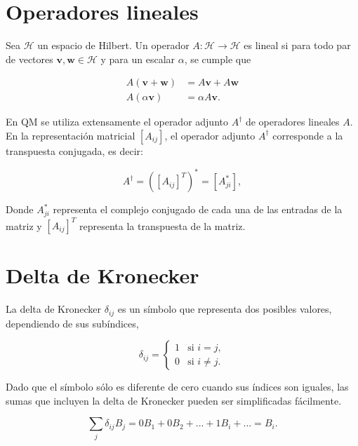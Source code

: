 \section{Operadores lineales}

Sea $\mathcal{H}$ un espacio de Hilbert. Un operador $A: \mathcal{H} \rightarrow \mathcal{H}$ es lineal si para todo par de vectores $\mathbf{v}, \mathbf{w} \in \mathcal{H}$ y para un escalar $\alpha$, se cumple que

\begin{align}
    A (\mathbf{v} + \mathbf{w}) &= A \mathbf{v} + A \mathbf{w} \\
    A (\alpha \mathbf{v}) &= \alpha A \mathbf{v} .
\end{align}

En QM se utiliza extensamente el operador adjunto $A^\dagger$ de operadores lineales $A$. En la representación matricial $[A_{ij}]$, el operador adjunto $A^\dagger$ corresponde a la transpuesta conjugada, es decir:

\begin{equation}
    A^\dagger = ([A_{ij}]^T)^* = [A_{ji}^*] ,
\end{equation}

Donde $A_{ji}^*$ representa el complejo conjugado de cada una de las entradas de la matriz y $[A_{ij}]^T$ representa la transpuesta de la matriz.

\section{Delta de Kronecker}

La delta de Kronecker $\delta_{ij}$ es un símbolo que representa dos posibles valores, dependiendo de sus subíndices,

\begin{equation}
    \delta_{ij} =
    \begin{cases}
        1 & \text{si } i = j , \\
        0 & \text{si } i \neq j .
    \end{cases} 
\end{equation}

Dado que el símbolo sólo es diferente de cero cuando sus índices son iguales, las sumas que incluyen la delta de Kronecker pueden ser simplificadas fácilmente.

\begin{equation}
    \sum\limits_j \delta_{ij} B_j = 0 B_1 + 0 B_2 + ... + 1 B_i + ... = B_i .
\end{equation}

